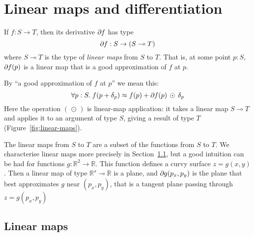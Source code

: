 \documentclass[sigplan,review]{acmart}
\newcommand{\deriv}{\partial}  %
\renewcommand{\to}{\rightarrow}    %
\newcommand{\linto}{\multimap}     %
\newcommand{\gradf}[1]{\deriv\hspace{-0.15mm} #1}  %
\renewcommand{\d}[1]{\delta_{\mathit{#1}}}   %
\newcommand{\real}{\mathbb{R}}       %
\newcommand{\lmcomp}{\,\circ\,}   %
\newcommand{\lmapply}{\,\odot\,}      %
\newcommand{\simon}[1]{}
\begin{document}
\simon{Do we need scan?  Or (specialising to $(+)$) cumulative sum?}

\section{Linear maps and differentiation}

If $f : S \to T$, then its derivative $\gradf{f}$ has type
$$\gradf{f} : S \to (S \linto T)$$
where $S \linto T$ is the type of \emph{linear maps} from $S$ to $T$.
That is, at some point $p:S$, $\gradf{f}(p)$ is a linear map
that is a good approximation of $f$ at $p$.

By ``a good approximation of $f$ at $p$'' we mean this:
$$
\forall p:S.\; f( p + \d{p} ) \approx f(p) + \gradf{f}(p) \lmapply \d{p}
$$
Here the operation $(\lmapply)$ is linear-map application: it takes a
linear map $S \linto T$ and applies it to an argument of type $S$,
giving a result of type $T$ (Figure~\ref{fig:linear-maps}).

The linear maps from $S$ to $T$ are a subset of the
functions from $S$ to $T$.  We characterise linear maps more precisely
in Section~\ref{sec:lin-maps}, but
a good intuition can be had for functions $g : \real^2 \to \real$.
This function defines a curvy surface $z = g(x,y)$.  Then a linear map
of type $\real^s \linto \real$ is a plane, and $\gradf{g}(p_x,p_y)$ is
the plane that best approximates $g$ near $(p_x,p_y)$, that is a tangent plane
passing through $z = g(p_x, p_y)$

\subsection{Linear maps} \label{sec:lin-maps}
\end{document}

